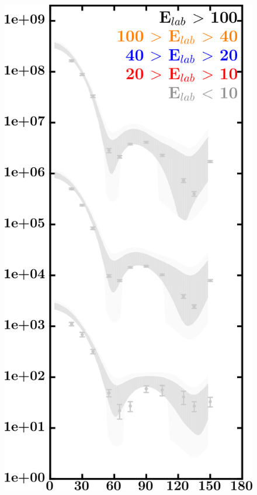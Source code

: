 \documentclass[twocolumn,secnumarabic,amssymb, nobibnotes, aps, prl,
superscriptaddress, nobalancelastpage, draft]{revtex4}
\begin{document}
\begin{figure}[!htb]
\begin{minipage}{0.4\linewidth}
        \includegraphics[width=\linewidth]{figures/ni64_neutronElastic.png}
        \label{DOM_ni64_neutron_elastic}
    \end{minipage}
    \centering
    \begin{minipage}{0.4\linewidth}
        \centering

\end{minipage}
\end{figure}
\end{document}
